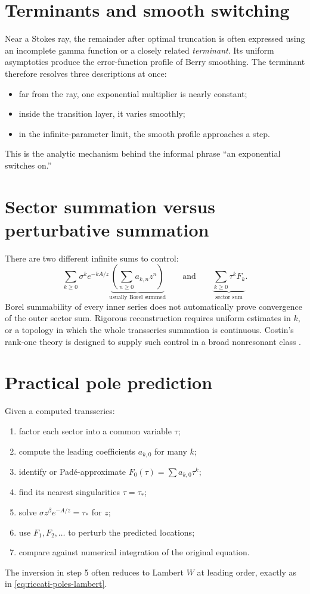 \documentclass[11pt,openany]{book}
\theoremstyle{definition}
\theoremstyle{plain}
\theoremstyle{remark}
\begin{document}
\section{Terminants and smooth switching}

Near a Stokes ray, the remainder after optimal truncation is often expressed using an incomplete gamma function or a closely related \emph{terminant}. Its uniform asymptotics produce the error-function profile of Berry smoothing. The terminant therefore resolves three descriptions at once:
\begin{itemize}
 \item far from the ray, one exponential multiplier is nearly constant;
 \item inside the transition layer, it varies smoothly;
 \item in the infinite-parameter limit, the smooth profile approaches a step.
\end{itemize}
This is the analytic mechanism behind the informal phrase ``an exponential switches on.''

\section{Sector summation versus perturbative summation}

There are two different infinite sums to control:
\begin{equation}\label{eq:two-summations}
 \sum_{k\ge0}\sigma^ke^{-kA/z}
 \underbrace{\left(\sum_{n\ge0}a_{k,n}z^n\right)}_{\text{usually Borel summed}}
 \qquad\text{and}\qquad
 \underbrace{\sum_{k\ge0}\tau^kF_k}_{\text{sector sum}}.
\end{equation}
Borel summability of every inner series does not automatically prove convergence of the outer sector sum. Rigorous reconstruction requires uniform estimates in $k$, or a topology in which the whole transseries summation is continuous. Costin's rank-one theory is designed to supply such control in a broad nonresonant class \cite{costin-1995,costin-1998}.

\section{Practical pole prediction}

Given a computed transseries:
\begin{enumerate}
 \item factor each sector into a common variable $\tau$;
 \item compute the leading coefficients $a_{k,0}$ for many $k$;
 \item identify or Pad\'e-approximate $F_0(\tau)=\sum a_{k,0}\tau^k$;
 \item find its nearest singularities $\tau=\tau_*$;
 \item solve $\sigma z^\beta e^{-A/z}=\tau_*$ for $z$;
 \item use $F_1,F_2,\dots$ to perturb the predicted locations;
 \item compare against numerical integration of the original equation.
\end{enumerate}
The inversion in step 5 often reduces to Lambert $W$ at leading order, exactly as in \eqref{eq:riccati-poles-lambert}.
\end{document}
